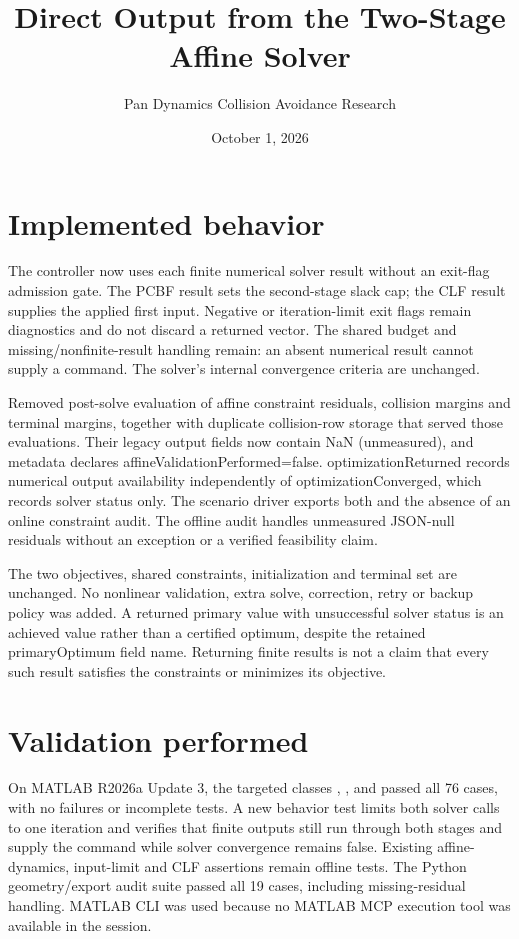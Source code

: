 \documentclass[11pt]{article}
\title{Direct Output from the Two-Stage Affine Solver}
\author{Pan Dynamics Collision Avoidance Research}
\date{October 1, 2026}
\begin{document}
\maketitle
\section{Implemented behavior}
The controller now uses each finite numerical solver result without an
exit-flag admission gate. The PCBF result sets the second-stage slack cap;
the CLF result supplies the applied first input. Negative or iteration-limit
exit flags remain diagnostics and do not discard a returned vector. The
shared budget and missing/nonfinite-result handling remain: an absent
numerical result cannot supply a command. The solver's internal convergence
criteria are unchanged.

Removed post-solve evaluation of affine constraint residuals, collision
margins and terminal margins, together with duplicate collision-row storage
that served those evaluations. Their legacy output fields now contain NaN
(unmeasured), and metadata declares affineValidationPerformed=false.
optimizationReturned records numerical output availability independently of
optimizationConverged, which records solver status only. The scenario driver
exports both and the absence of an online constraint audit. The offline audit
handles unmeasured JSON-null residuals without an exception or a verified
feasibility claim.

The two objectives, shared constraints, initialization and terminal set are
unchanged. No nonlinear validation, extra solve, correction, retry or backup
policy was added. A returned primary value with unsuccessful solver status is
an achieved value rather than a certified optimum, despite the retained
primaryOptimum field name. Returning finite results is not a claim that every
such result satisfies the constraints or minimizes its objective.

\section{Validation performed}
On MATLAB R2026a Update 3, the targeted classes
,
, and
passed all 76 cases, with no failures or incomplete tests. A new behavior test
limits both solver calls to one iteration and verifies that finite outputs
still run through both stages and supply the command while solver convergence
remains false. Existing affine-dynamics, input-limit and CLF assertions remain
offline tests. The Python geometry/export audit suite passed all 19 cases,
including missing-residual handling. MATLAB CLI was used because no MATLAB
MCP execution tool was available in the session.
\end{document}
